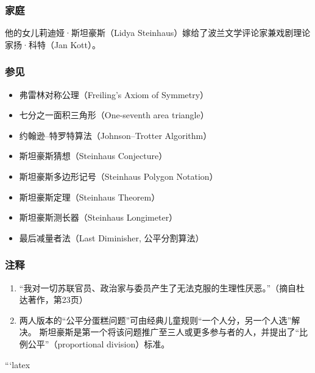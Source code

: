 \subsubsection{家庭}
他的女儿莉迪娅·斯坦豪斯（Lidya Steinhaus）嫁给了波兰文学评论家兼戏剧理论家扬·科特（Jan Kott）。
\subsubsection{参见}
\begin{itemize}
  \item 弗雷林对称公理（Freiling's Axiom of Symmetry）
  \item 七分之一面积三角形（One-seventh area triangle）
  \item 约翰逊–特罗特算法（Johnson–Trotter Algorithm）
  \item 斯坦豪斯猜想（Steinhaus Conjecture）
  \item 斯坦豪斯多边形记号（Steinhaus Polygon Notation）
  \item 斯坦豪斯定理（Steinhaus Theorem）
  \item 斯坦豪斯测长器（Steinhaus Longimeter）
  \item 最后减量者法（Last Diminisher, 公平分割算法）
\end{itemize}
\subsubsection{注释}
\begin{enumerate}[label=\Alph*.]
  \item “我对一切苏联官员、政治家与委员产生了无法克服的生理性厌恶。”（摘自杜达著作，第23页）
  \item 两人版本的“公平分蛋糕问题”可由经典儿童规则“一个人分，另一个人选”解决。  
  斯坦豪斯是第一个将该问题推广至三人或更多参与者的人，并提出了“比例公平”（proportional division）标准。
\end{enumerate}
```latex
